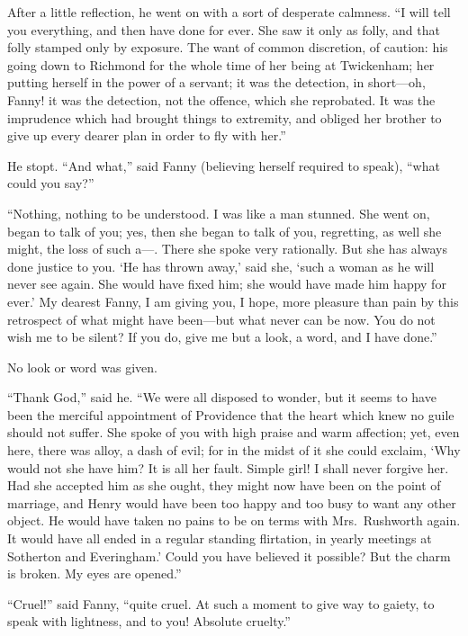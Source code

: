 \documentclass{article}
\begin{document}
After a little reflection, he went on with a sort
of desperate calmness.  ``I will tell you everything,
and then have done for ever.  She saw it only as folly,
and that folly stamped only by exposure.  The want of
common discretion, of caution:  his going down to Richmond
for the whole time of her being at Twickenham; her putting
herself in the power of a servant; it was the detection,
in short---oh, Fanny! it was the detection, not the offence,
which she reprobated.  It was the imprudence which had
brought things to extremity, and obliged her brother
to give up every dearer plan in order to fly with her.''

He stopt.  ``And what,'' said Fanny (believing herself
required to speak), ``what could you say?''

``Nothing, nothing to be understood.  I was like a man stunned.
She went on, began to talk of you; yes, then she began
to talk of you, regretting, as well she might, the loss
of such a---.  There she spoke very rationally.  But she
has always done justice to you.  `He has thrown away,'
said she, `such a woman as he will never see again.
She would have fixed him; she would have made him happy
for ever.'  My dearest Fanny, I am giving you, I hope,
more pleasure than pain by this retrospect of what might
have been---but what never can be now.  You do not wish me
to be silent?  If you do, give me but a look, a word, and I
have done.''

No look or word was given.

``Thank God,'' said he.  ``We were all disposed to wonder,
but it seems to have been the merciful appointment
of Providence that the heart which knew no guile
should not suffer.  She spoke of you with high praise
and warm affection; yet, even here, there was alloy,
a dash of evil; for in the midst of it she could exclaim,
`Why would not she have him?  It is all her fault.
Simple girl!  I shall never forgive her.  Had she accepted
him as she ought, they might now have been on the point
of marriage, and Henry would have been too happy and too
busy to want any other object.  He would have taken
no pains to be on terms with Mrs.\ Rushworth again.
It would have all ended in a regular standing flirtation,
in yearly meetings at Sotherton and Everingham.'  Could you
have believed it possible?  But the charm is broken.
My eyes are opened.''

``Cruel!'' said Fanny, ``quite cruel.  At such a moment to
give way to gaiety, to speak with lightness, and to you!
Absolute cruelty.''
\end{document}
